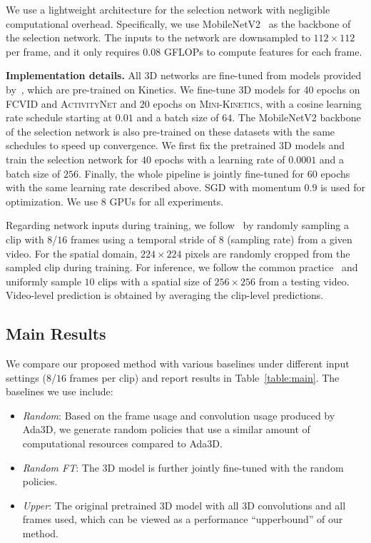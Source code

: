 \documentclass[final]{cvpr}
\newcommand{\anet}{{\scshape ActivityNet}\xspace}
\newcommand{\fcvid}{{\scshape FCVID}\xspace}
\newcommand{\minik}{{\scshape Mini-Kinetics}\xspace}
\newcommand{\system}{{Ada3D}\xspace}
\begin{document}
We use a lightweight architecture for the selection network with negligible computational overhead. Specifically, we use MobileNetV2~\cite{mobilenetv2} as the backbone of the selection network. The inputs to the network are downsampled to $112 \times 112$ per frame, and it only requires $0.08$ GFLOPs to compute features for each frame.

\vspace{0.05in}
\noindent\textbf{Implementation details.}
All 3D networks are fine-tuned from models provided by~\cite{slowfast_repo}, which are pre-trained on Kinetics. We fine-tune 3D models for 40 epochs on \fcvid and \anet and $20$ epochs on \minik, with a cosine learning rate schedule starting at $0.01$ and a batch size of $64$. The MobileNetV2 backbone of the selection network is also pre-trained on these datasets with the same schedules to speed up convergence. We first fix the pretrained 3D models and train the selection network for $40$ epochs with a learning rate of $0.0001$ and a batch size of $256$. Finally, the whole pipeline is jointly fine-tuned for $60$ epochs with the same learning rate described above. SGD with momentum $0.9$ is used for optimization. We use $8$ GPUs for all experiments. 

Regarding network inputs during training, we follow~\cite{slowfast,x3d} by randomly sampling a clip with $8$/$16$ frames using a temporal stride of $8$ (sampling rate) from a given video. For the spatial domain, $224 \times 224$ pixels are randomly cropped from the sampled clip during training. For inference, we follow the common practice~\cite{slowfast,x3d,nonlocal} and uniformly sample $10$ clips with a spatial size of $256 \times 256$ from a testing video. Video-level prediction is obtained by averaging the clip-level predictions.

\subsection{Main Results}
We compare our proposed method with various baselines under different input settings ($8$/$16$ frames per clip) and report results in Table~\ref{table:main}. The baselines we use include:
\begin{itemize} \itemsep0.1em
    \item \emph{Random}: Based on the frame usage and convolution usage produced by \system, we generate random policies that use a similar amount of computational resources compared to \system.    
    \item \emph{Random FT}: The 3D model is further jointly fine-tuned with the random policies.
    \item \emph{Upper}: The original pretrained 3D model with all 3D convolutions and all frames used, which can be viewed as a performance ``upperbound'' of our method.
\end{itemize}
\end{document}
